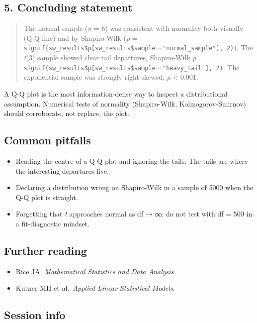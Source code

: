 \documentclass[
]{article}
\providecommand{\tightlist}{%
  \setlength{\itemsep}{0pt}\setlength{\parskip}{0pt}}
\begin{document}
\subsection{5. Concluding statement}\label{concluding-statement}

\begin{quote}
The normal sample (\emph{n} = \texttt{n}) was consistent with normality
both visually (Q-Q line) and by Shapiro-Wilk (\emph{p} =
\texttt{signif(sw\_results\$p{[}sw\_results\$sample=="normal\_sample"{]},\ 2)}).
The \emph{t}(3) sample showed clear tail departures, Shapiro-Wilk
\emph{p} =
\texttt{signif(sw\_results\$p{[}sw\_results\$sample=="heavy\_tail"{]},\ 2)}.
The exponential sample was strongly right-skewed, \emph{p} \textless{}
0.001.
\end{quote}

A Q-Q plot is the most information-dense way to inspect a distributional
assumption. Numerical tests of normality (Shapiro-Wilk,
Kolmogorov-Smirnov) should corroborate, not replace, the plot.

\subsection{Common pitfalls}\label{common-pitfalls}

\begin{itemize}
\tightlist
\item
  Reading the centre of a Q-Q plot and ignoring the tails. The tails are
  where the interesting departures live.
\item
  Declaring a distribution wrong on Shapiro-Wilk in a sample of 5000
  when the Q-Q plot is straight.
\item
  Forgetting that \emph{t} approaches normal as df → ∞; do not test with
  df = 500 in a fit-diagnostic mindset.
\end{itemize}

\subsection{Further reading}\label{further-reading}

\begin{itemize}
\tightlist
\item
  Rice JA. \emph{Mathematical Statistics and Data Analysis}.
\item
  Kutner MH et al.~\emph{Applied Linear Statistical Models}.
\end{itemize}

\subsection{Session info}\label{session-info}
\end{document}
